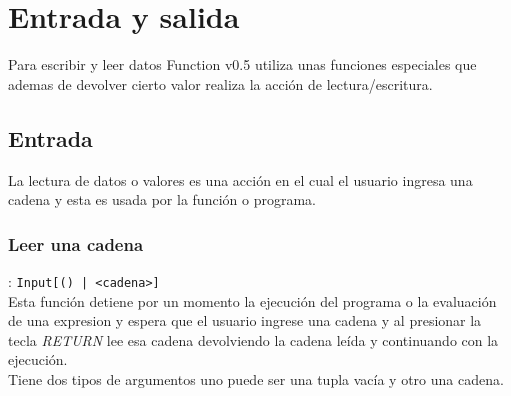 
\titlespacing{\subsection}{0pt}{10pt}{0pt}

\chapter{Entrada y salida}
   Para escribir y leer datos Function v0.5 utiliza unas funciones especiales que ademas de devolver cierto valor realiza la acción de lectura/escritura.
   
   \section{Entrada}
      La lectura de datos o valores es una acción en el cual el usuario ingresa una cadena y esta es usada por la función o programa.
      
      \subsection*{Leer una cadena}: \texttt{Input[() | <cadena>]}\\
      Esta función detiene por un momento la ejecución del programa o la evaluación de una expresion y espera que el usuario ingrese una cadena y al presionar la tecla {\it RETURN} lee esa cadena devolviendo la cadena leída y continuando con la ejecución.
      \\
      
      Tiene dos tipos de argumentos uno puede ser una tupla vacía y otro una cadena.
      
      \begin{fxcode}
         \\
         \\
         \\
         \\
         \\
         \outcode{[]}
      \end{fxcode}
      
